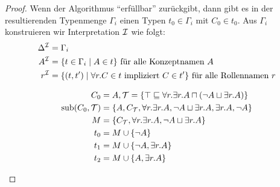\begin{proof}
    Wenn der Algorithmus \enquote{erfüllbar} zurückgibt, dann gibt es in der resultierenden Typenmenge $\Gamma_i$ einen Typen $t_0 \in \Gamma_i$ mit $C_0 \in t_0$. Aus $\Gamma_i$ konstruieren wir Interpretation $\mathcal{I}$ wie folgt:
\begin{align*}
    \Delta^{\mathcal{I}} &= \Gamma_{i}\\
    A^{\mathcal{I}} &= \{ t \in \Gamma_{i} \mid A \in t \} \text{ für alle Konzeptnamen } A\\
    r^{\mathcal{I}} &= \{ (t,t') \mid \forall r.C \in t \text{ impliziert }C \in t' \} \text{ für alle Rollennamen } r
\end{align*} 

\begin{tafel}\label{t:example51}
    \begin{align*}
        C_0 &= A, \mathcal{T} = \{ \top \sqsubseteq \forall r.\exists r.A \sqcap(\neg A \sqcup \exists r.A)\}\\
        \operatorname{sub}(C_0, \mathcal{T}) &= \{ A, C_{\mathcal{T}}, \forall r.\exists r.A, \neg A \sqcup \exists r.A, \exists r.A, \neg A\}\\
        M &= \{C_{\mathcal{T}}, \forall r.\exists r.A, \neg A \sqcup \exists r.A\}\\
        t_0 &= M \cup \{\neg A\}\\
        t_1 &= M \cup \{\neg A, \exists r.A\}\\
        t_2 &= M \cup \{A, \exists r.A\}\\
    \end{align*}

    \begin{center}
    \end{center}
\end{tafel}


\end{proof}

